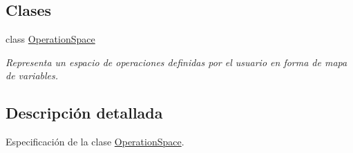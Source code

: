 \subsection*{Clases}
\begin{DoxyCompactItemize}
\item 
class \hyperlink{class_operation_space}{Operation\+Space}
\begin{DoxyCompactList}\small\item\em Representa un espacio de operaciones definidas por el usuario en forma de mapa de variables. \end{DoxyCompactList}\end{DoxyCompactItemize}


\subsection{Descripción detallada}
Especificación de la clase \hyperlink{class_operation_space}{Operation\+Space}. 

